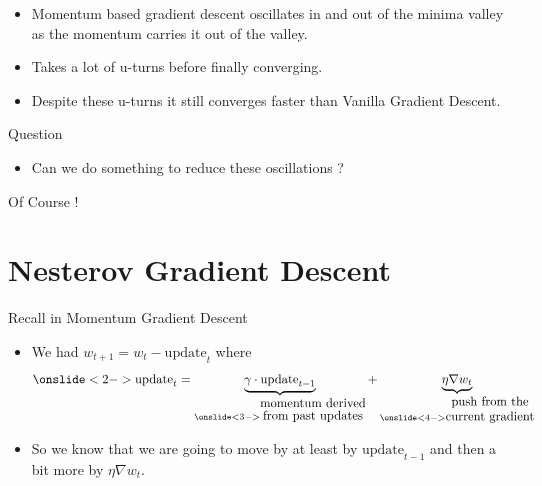 \documentclass[10pt, aspectratio=169]{beamer}
\begin{document}
\begin{frame}
\begin{itemize}
\item<1-> Momentum based gradient descent oscillates in and out of the minima valley as the momentum carries it out of the valley.
\item<2-> Takes a lot of u-turns before finally converging.
\item<3-> Despite these u-turns it still converges faster than Vanilla Gradient Descent.
\end{itemize}
\end{frame}


\begin{frame}
\begin{block}{Question}
\begin{itemize}
\item<1-> Can we do something to reduce these oscillations ?
\end{itemize}
\leftpointright \hspace{0.1cm} Of Course !
\end{block}
\end{frame}


\section{Nesterov Gradient Descent}

\begin{frame}
\begin{block}{Recall in Momentum Gradient Descent}
\begin{itemize}
\item<1-> We had $w_{t+1} = w_t - \text{update}_t$ where
$$\onslide<2->{\text{update}_t = \underbrace{\gamma \cdot \text{update}_{t-1}}_{\onslide<3->{\shortstack{momentum derived \\ from past updates}}} + \underbrace{\eta \nabla w_t}_{\onslide<4->{\shortstack{push from the \\ current gradient}}}}$$
\item<5-> So we know that we are going to move by at least by $\text{update}_{t-1}$ and then a bit more by $\eta \nabla w_t$.
\end{itemize}
\end{block}
\end{frame}
\end{document}

